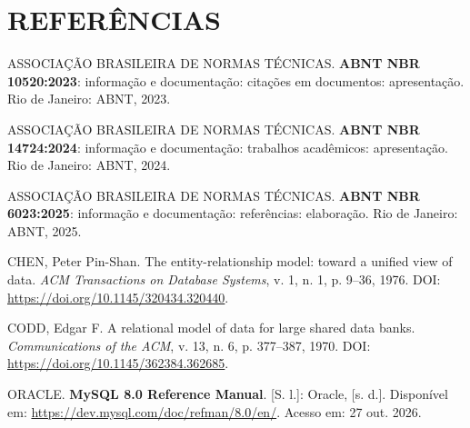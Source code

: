 \documentclass[12pt,a4paper]{article}
\begin{document}
\section*{REFERÊNCIAS}
\begingroup
\small
\singlespacing
\setlength{\parindent}{0pt}
\setlength{\parskip}{6pt}

ASSOCIAÇÃO BRASILEIRA DE NORMAS TÉCNICAS. \textbf{ABNT NBR 10520:2023}: informação e documentação: citações em documentos: apresentação. Rio de Janeiro: ABNT, 2023.

ASSOCIAÇÃO BRASILEIRA DE NORMAS TÉCNICAS. \textbf{ABNT NBR 14724:2024}: informação e documentação: trabalhos acadêmicos: apresentação. Rio de Janeiro: ABNT, 2024.

ASSOCIAÇÃO BRASILEIRA DE NORMAS TÉCNICAS. \textbf{ABNT NBR 6023:2025}: informação e documentação: referências: elaboração. Rio de Janeiro: ABNT, 2025.

CHEN, Peter Pin-Shan. The entity-relationship model: toward a unified view of data. \textit{ACM Transactions on Database Systems}, v. 1, n. 1, p. 9--36, 1976. DOI: \url{https://doi.org/10.1145/320434.320440}.

CODD, Edgar F. A relational model of data for large shared data banks. \textit{Communications of the ACM}, v. 13, n. 6, p. 377--387, 1970. DOI: \url{https://doi.org/10.1145/362384.362685}.

ORACLE. \textbf{MySQL 8.0 Reference Manual}. [S. l.]: Oracle, [s. d.]. Disponível em: \url{https://dev.mysql.com/doc/refman/8.0/en/}. Acesso em: 27 out. 2026.

\endgroup
\end{document}
